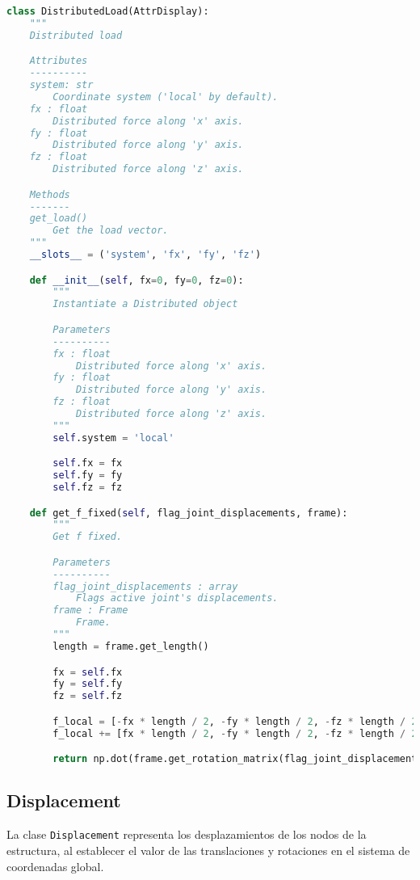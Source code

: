 \begin{lstlisting}[language=Python,caption=Clase \texttt{DistributedLoad} implementada en el archivo \texttt{primitives.py}.,label=alg:DistributedLoad, frame=single]
    class DistributedLoad(AttrDisplay):
    """
    Distributed load

    Attributes
    ----------
    system: str
        Coordinate system ('local' by default).
    fx : float
        Distributed force along 'x' axis.
    fy : float
        Distributed force along 'y' axis.
    fz : float
        Distributed force along 'z' axis.

    Methods
    -------
    get_load()
        Get the load vector.
    """
    __slots__ = ('system', 'fx', 'fy', 'fz')

    def __init__(self, fx=0, fy=0, fz=0):
        """
        Instantiate a Distributed object

        Parameters
        ----------
        fx : float
            Distributed force along 'x' axis.
        fy : float
            Distributed force along 'y' axis.
        fz : float
            Distributed force along 'z' axis.
        """
        self.system = 'local'

        self.fx = fx
        self.fy = fy
        self.fz = fz

    def get_f_fixed(self, flag_joint_displacements, frame):
        """
        Get f fixed.

        Parameters
        ----------
        flag_joint_displacements : array
            Flags active joint's displacements.
        frame : Frame
            Frame.
        """
        length = frame.get_length()

        fx = self.fx
        fy = self.fy
        fz = self.fz

        f_local = [-fx * length / 2, -fy * length / 2, -fz * length / 2, 0, fz * length ** 2 / 12, -fy * length ** 2 / 12]
        f_local += [fx * length / 2, -fy * length / 2, -fz * length / 2, 0, -fz * length ** 2 / 12, fy * length ** 2 / 12]

        return np.dot(frame.get_rotation_matrix(flag_joint_displacements), f_local)
\end{lstlisting}

\subsection{Displacement}

La clase \verb|Displacement| representa los desplazamientos de los nodos de la estructura, al establecer el valor de las translaciones y rotaciones en el sistema de coordenadas global.\\


